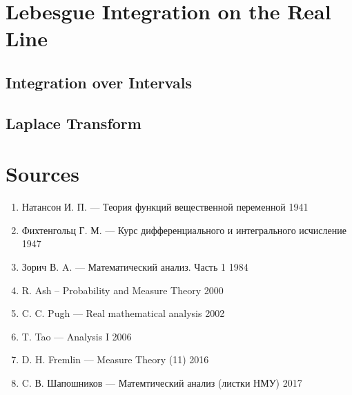 \documentclass[12pt]{scrartcl}
\renewcommand{\.}{\; . \;}
\begin{document}
\section{Lebesgue Integration on the Real Line}
\subsection{Integration over Intervals}
\subsection{Laplace Transform}
\newpage
\section*{Sources}
\begin{enumerate}
\item Натансон И. П.  --- Теория функций вещественной переменной 1941
\item  Фихтенгольц Г. М. --- Курс дифференциального и интегрального исчисление 1947
\item Зорич В. A. --- Математический анализ. Часть 1 1984
\item R. Ash -- Probability and Measure Theory 2000
\item C. C. Pugh --- Real mathematical analysis 2002
\item T. Tao --- Analysis I 2006
\item D. H. Fremlin --- Measure Theory (11) 2016
\item C. В. Шапошников --- Матемтический анализ (листки НМУ) 2017
\end{enumerate}
\end{document}
